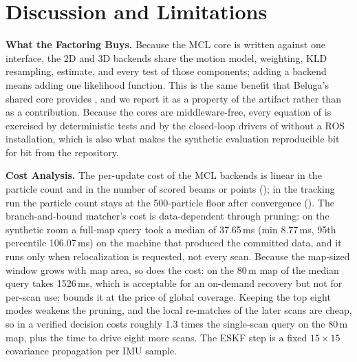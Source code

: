 \section{Discussion and Limitations}\label{sec:disc}

\noindent\textbf{What the Factoring Buys.} Because the MCL core is written against one  interface, the 2D and 3D backends share the motion model, weighting, KLD resampling, estimate, and every test of those components; adding a backend means adding one likelihood function. This is the same benefit that Beluga's shared core provides \citep{puga2024beluga}, and we report it as a property of the artifact rather than as a contribution. Because the cores are middleware-free, every equation of  is exercised by deterministic tests and by the closed-loop drivers of  without a ROS installation, which is also what makes the synthetic evaluation reproducible bit for bit from the repository.

\noindent\textbf{Cost Analysis.} The per-update cost of the MCL backends is linear in the particle count and in the number of scored beams or points (); in the tracking run the particle count stays at the 500-particle floor after convergence (). The branch-and-bound matcher's cost is data-dependent through pruning: on the synthetic room a full-map query took a median of 37.65\,ms (min 8.77\,ms, 95th percentile 106.07\,ms) on the machine that produced the committed data, and it runs only when relocalization is requested, not every scan. Because the map-sized window grows with map area, so does the cost: on the 80\,m map of  the median query takes 1526\,ms, which is acceptable for an on-demand recovery but not for per-scan use;  bounds it at the price of global coverage. Keeping the top eight modes weakens the pruning, and the local re-matches of the later scans are cheap, so in  a verified decision costs roughly 1.3 times the single-scan query on the 80\,m map, plus the time to drive eight more scans. The ESKF step is a fixed $15\times15$ covariance propagation per IMU sample.

